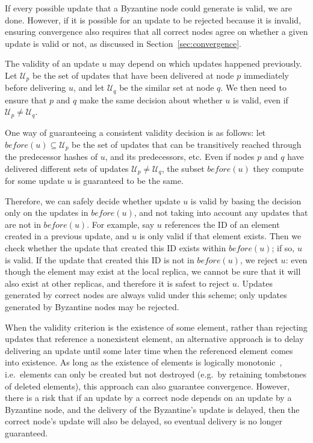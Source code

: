 \documentclass[sigplan,review]{acmart}
\begin{document}
If every possible update that a Byzantine node could generate is valid, we are done.
However, if it is possible for an update to be rejected because it is invalid, ensuring convergence also requires that all correct nodes agree on whether a given update is valid or not, as discussed in Section~\ref{sec:convergence}.

The validity of an update $u$ may depend on which updates happened previously.
Let $\mathcal{U}_p$ be the set of updates that have been delivered at node $p$ immediately before delivering $u$, and let $\mathcal{U}_q$ be the similar set at node $q$.
We then need to ensure that $p$ and $q$ make the same decision about whether $u$ is valid, even if $\mathcal{U}_p \ne \mathcal{U}_q$.

One way of guaranteeing a consistent validity decision is as follows: let $\mathit{before}(u) \subseteq \mathcal{U}_p$ be the set of updates that can be transitively reached through the predecessor hashes of $u$, and its predecessors, etc.
Even if nodes $p$ and $q$ have delivered different sets of updates $\mathcal{U}_p \ne \mathcal{U}_q$, the subset $\mathit{before}(u)$ they compute for some update $u$ is guaranteed to be the same.

Therefore, we can safely decide whether update $u$ is valid by basing the decision only on the updates in $\mathit{before}(u)$, and not taking into account any updates that are not in $\mathit{before}(u)$.
For example, say $u$ references the ID of an element created in a previous update, and $u$ is only valid if that element exists.
Then we check whether the update that created this ID exists within $\mathit{before}(u)$; if so, $u$ is valid.
If the update that created this ID is not in $\mathit{before}(u)$, we reject $u$: even though the element may exist at the local replica, we cannot be sure that it will also exist at other replicas, and therefore it is safest to reject $u$.
Updates generated by correct nodes are always valid under this scheme; only updates generated by Byzantine nodes may be rejected.

When the validity criterion is the existence of some element, rather than rejecting updates that reference a nonexistent element, an alternative approach is to delay delivering an update until some later time when the referenced element comes into existence.
As long as the existence of elements is logically monotonic~\cite{Alvaro:2011}, i.e.\ elements can only be created but not destroyed (e.g.\ by retaining tombstones of deleted elements), this approach can also guarantee convergence.
However, there is a risk that if an update by a correct node depends on an update by a Byzantine node, and the delivery of the Byzantine's update is delayed, then the correct node's update will also be delayed, so eventual delivery is no longer guaranteed.
\end{document}
